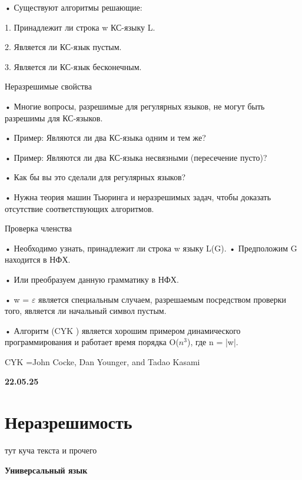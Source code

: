 \documentclass{article}
\begin{document}
• Существуют алгоритмы решающие:

1. Принадлежит ли строка w КС-языку L.

2. Является ли КС-язык пустым.

3. Является ли КС-язык бесконечным.

Неразрешимые свойства

• Многие вопросы, разрешимые для регулярных языков, не
могут быть разрешимы для КС-языков.

• Пример: Являются ли два КС-языка одним и тем же?

• Пример: Являются ли два КС-языка несвязными (пересечение
пусто)?

• Как бы вы это сделали для регулярных языков?

• Нужна теория машин Тьюринга и неразрешимых задач, чтобы
доказать отсутствие соответствующих алгоритмов.

Проверка членства

• Необходимо узнать, принадлежит ли строка w языку L(G).
• Предположим G находится в НФХ.

• Или преобразуем данную грамматику в НФХ.

• w = $\varepsilon $ является специальным случаем, разрешаемым
посредством проверки того, является ли начальный символ
пустым.

• Алгоритм (CYK ) является хорошим примером
динамического программирования и работает время
порядка O($n^3$), где n = |w|.

CYK =John Cocke, Dan Younger, and Tadao Kasami



\vspace{5mm}

\textbf{22.05.25}


\section{Неразрешимость}






тут куча текста и прочего 



\textbf{Универсальный язык}
\end{document}
